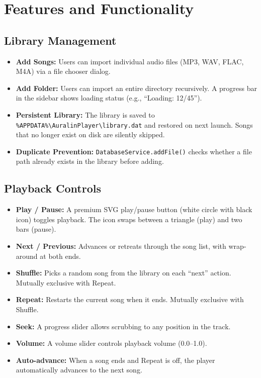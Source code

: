 ﻿\documentclass[12pt]{report}
\begin{document}
\chapter{Features and Functionality}

\section{Library Management}
\begin{itemize}
    \item \textbf{Add Songs:} Users can import individual audio files (MP3, WAV, FLAC, M4A) via a file chooser dialog.
    \item \textbf{Add Folder:} Users can import an entire directory recursively. A progress bar in the sidebar shows loading status (e.g., ``Loading: 12/45'').
    \item \textbf{Persistent Library:} The library is saved to \texttt{\%APPDATA\%\textbackslash AuralinPlayer\textbackslash library.dat} and restored on next launch. Songs that no longer exist on disk are silently skipped.
    \item \textbf{Duplicate Prevention:} \texttt{DatabaseService.addFile()} checks whether a file path already exists in the library before adding.
\end{itemize}

\section{Playback Controls}
\begin{itemize}
    \item \textbf{Play / Pause:} A premium SVG play/pause button (white circle with black icon) toggles playback. The icon swaps between a triangle (play) and two bars (pause).
    \item \textbf{Next / Previous:} Advances or retreats through the song list, with wrap-around at both ends.
    \item \textbf{Shuffle:} Picks a random song from the library on each ``next'' action. Mutually exclusive with Repeat.
    \item \textbf{Repeat:} Restarts the current song when it ends. Mutually exclusive with Shuffle.
    \item \textbf{Seek:} A progress slider allows scrubbing to any position in the track.
    \item \textbf{Volume:} A volume slider controls playback volume (0.0--1.0).
    \item \textbf{Auto-advance:} When a song ends and Repeat is off, the player automatically advances to the next song.
\end{itemize}
\end{document}
